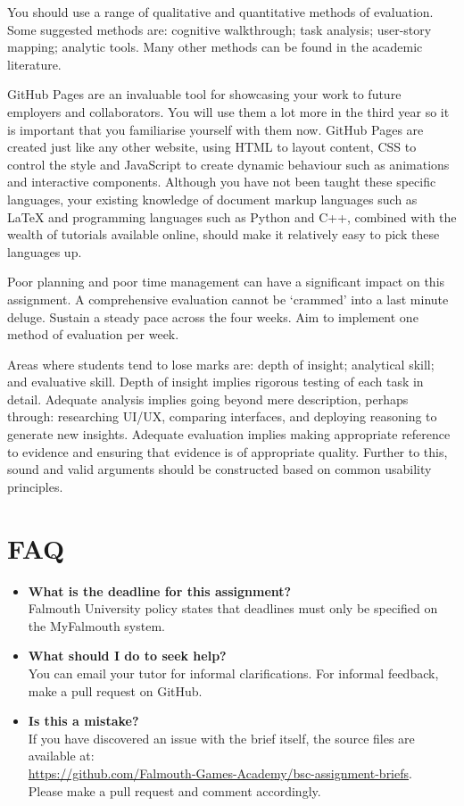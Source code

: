 \documentclass{../../../fal_assignment}
\begin{document}
You should use a range of qualitative and quantitative methods of evaluation. Some suggested methods are: cognitive walkthrough; task analysis; user-story mapping; analytic tools. Many other methods can be found in the academic literature.

GitHub Pages are an invaluable tool for showcasing your work to future employers and collaborators. You will use them a lot more in the third year so it is important that you familiarise yourself with them now. GitHub Pages are created just like any other website, using HTML to layout content, CSS to control the style and JavaScript to create dynamic behaviour such as animations and interactive components. Although you have not been taught these specific languages, your existing knowledge of document markup languages such as LaTeX and programming languages such as Python and C++, combined with the wealth of tutorials available online, should make it relatively easy to pick these languages up.

Poor planning and poor time management can have a significant impact on this assignment. A comprehensive evaluation cannot be `crammed' into a last minute deluge. Sustain a steady pace across the four weeks. Aim to implement one method of evaluation per week.

Areas where students tend to lose marks are: depth of insight; analytical skill; and evaluative skill. Depth of insight implies rigorous testing of each task in detail. Adequate analysis implies going beyond mere description, perhaps through: researching UI/UX, comparing interfaces, and deploying reasoning to generate new insights. Adequate evaluation implies making appropriate reference to evidence and ensuring that evidence is of appropriate quality. Further to this, sound and valid arguments should be constructed based on common usability principles. 

\section*{FAQ}

\begin{itemize}
	\item 	\textbf{What is the deadline for this assignment?} \\ 
    		Falmouth University policy states that deadlines must only be specified on the MyFalmouth system.
    		
	\item 	\textbf{What should I do to seek help?} \\ 
    		You can email your tutor for informal clarifications. For informal feedback, make a pull request on GitHub. 
    		
    	\item 	\textbf{Is this a mistake?} \\ 	
    		If you have discovered an issue with the brief itself, the source files are available at: \\
    		\url{https://github.com/Falmouth-Games-Academy/bsc-assignment-briefs}.\\
    		 Please make a pull request and comment accordingly.
\end{itemize}
\end{document}
